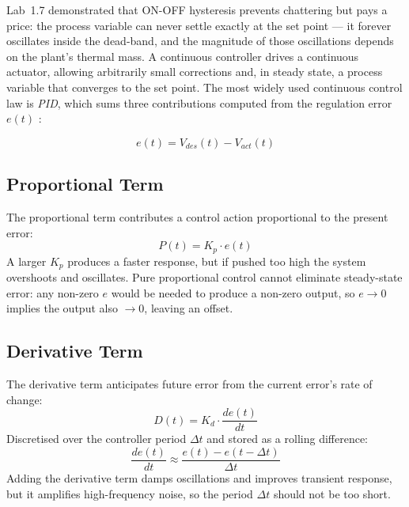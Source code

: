 \documentclass[12pt]{article}
\begin{document}
Lab~1.7 demonstrated that ON-OFF hysteresis prevents chattering but pays a price: the process variable can never settle exactly at the set point --- it forever oscillates inside the dead-band, and the magnitude of those oscillations depends on the plant's thermal mass. A continuous controller drives a continuous actuator, allowing arbitrarily small corrections and, in steady state, a process variable that converges to the set point. The most widely used continuous control law is \emph{PID}, which sums three contributions computed from the regulation error $e(t)$ \cite{labbrief, astrom}:

\begin{equation}
e(t) = V_{des}(t) - V_{act}(t)
\label{eq:err}
\end{equation}

\subsection{Proportional Term}

The proportional term contributes a control action proportional to the present error:
\begin{equation}
P(t) = K_p \cdot e(t)
\label{eq:p}
\end{equation}
A larger $K_p$ produces a faster response, but if pushed too high the system overshoots and oscillates. Pure proportional control cannot eliminate steady-state error: any non-zero $e$ would be needed to produce a non-zero output, so $e \to 0$ implies the output also $\to 0$, leaving an offset.

\subsection{Derivative Term}

The derivative term anticipates future error from the current error's rate of change:
\begin{equation}
D(t) = K_d \cdot \frac{de(t)}{dt}
\label{eq:d}
\end{equation}
Discretised over the controller period $\Delta t$ and stored as a rolling difference:
\begin{equation}
\frac{de(t)}{dt} \approx \frac{e(t) - e(t - \Delta t)}{\Delta t}
\label{eq:d_disc}
\end{equation}
Adding the derivative term damps oscillations and improves transient response, but it amplifies high-frequency noise, so the period $\Delta t$ should not be too short.
\end{document}
